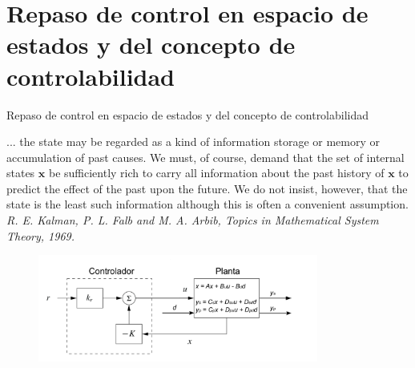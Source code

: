 \documentclass{beamer}
\begin{document}
\section{Repaso de control en espacio de estados y del concepto de controlabilidad} 
\tableofcontents[currentsection]
\begin{frame}{Repaso de control en espacio de estados y del concepto de controlabilidad}

... the state may be regarded as a kind of information storage or memory or accumulation of past causes. We must, of course, demand that the set of internal states $\mathbf{x}$ be sufficiently rich to carry all information about the past history of $\mathbf{x}$ to predict the effect of the past upon the future. We do not insist, however, that the state is the least such information although this is often a convenient assumption. \emph{R. E. Kalman, P. L. Falb and M. A. Arbib, Topics in Mathematical System Theory, 1969.}

\begin{figure}
    \centering
    \includegraphics[width=0.82\textwidth]{MIMO_ssf.pdf}
\end{figure}

\end{frame}
\end{document}
